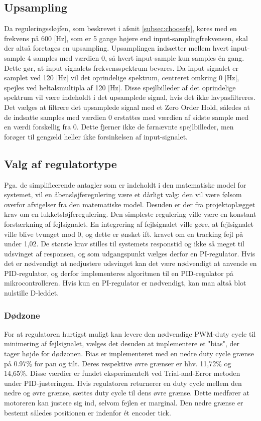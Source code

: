 \subsection{Upsampling}
\label{subsec:upsampling}
Da reguleringssløjfen, som beskrevet i afsnit \ref{subsec:choosefs}, køres med en frekvens på 600 [Hz],
som er 5 gange højere end input-samplingfrekvensen, skal der altså foretages en upsampling.
Upsamplingen indsætter mellem hvert input-sample 4 samples med værdien 0, så hvert input-sample
kun samples én gang. Dette gør, at input-signalets frekvensspektrum bevares.
Da input-signalet er samplet ved 120 [Hz] vil det oprindelige spektrum, centreret omkring 0 [Hz],
spejles ved heltalsmultipla af 120 [Hz]. Disse spejlbilleder af det oprindelige spektrum vil være
indeholdt i det upsamplede signal, hvis det ikke lavpasfiltreres. 
Det vælges at filtrere det upsamplede signal med et Zero Order Hold,
således at de indsatte samples med værdien 0 erstattes med værdien af sidste sample
med en værdi forskellig fra 0. Dette fjerner ikke de førnævnte spejlbilleder, men forøger
til gengæld heller ikke forsinkelsen af input-signalet.

\subsection{Valg af regulatortype}
\label{ss:ValgReg}
Pga. de simplificerende antagler som er indeholdt i den matematiske model for systemet,
vil en åbensløjferegulering være et dårligt valg: den vil være følsom overfor afvigelser fra den
matematiske model. Desuden er der fra projektoplægget krav om en lukketsløjferegulering.
Den simpleste regulering ville være en konstant forstærkning af fejlsignalet.
En integrering af fejlsignalet ville gøre, at fejlsignalet ville blive tvunget mod 0,
og dette er ønsket ift. kravet om en tracking fejl på under 1,02\degree.
De største krav stilles til systemets responstid og ikke så meget til udsvinget af responsen,
og som udgangspunkt vælges derfor en PI-regulator.
Hvis det er nødvendigt at nedjustere udsvinget kan det være nødvendigt at anvende en PID-regulator,
og derfor implementeres algoritmen til en PID-regulator på mikrocontrolleren.
Hvis kun en PI-regulator er nødvendigt, kan man altså blot nulstille D-leddet.

\subsubsection{Dødzone}
For at regulatoren hurtigst muligt kan levere den nødvendige PWM-duty cycle til minimering af fejlsignalet,
vælges det desuden at implementere et "bias", der tager højde for dødzonen.
Bias er implementeret med en nedre duty cycle grænse på 0.97\% for pan og tilt.
Deres respektive øvre grænser er hhv. 11,72\% og 14,65\%.
Disse værdier er fundet eksperimentelt ved Trial-and-Error metoden under PID-justeringen.
Hvis regulatoren returnerer en duty cycle mellem den nedre og øvre grænse, sættes duty cycle til dens øvre grænse.
Dette medfører at motoreren kan justere sig ind, selvom fejlen er marginal.
Den nedre grænse er bestemt således positionen er indenfor ét encoder tick.

